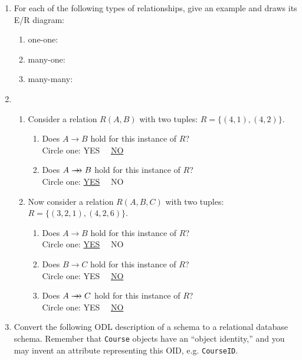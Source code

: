 \documentclass[12pt]{article}
\begin{document}
\begin{enumerate}
\newpage
\item For each of the following types of relationships, give an
	example and draws its E/R diagram:
    \begin{enumerate}
	\item one-one:
	\item many-one:
	\item many-many:
    \end{enumerate}
\item 
  \begin{enumerate}
    \item Consider a relation $R(A,B)$ with two tuples: $R=\{(4,1),(4,2)\}$.
    \begin{enumerate}
	\item Does $A\rightarrow B$ hold for this instance of $R$?\\
	    \smallskip
	    Circle one: YES \ \ \underline{NO}
	    \bigskip
	\item Does $A\rightarrow\!\hspace{-0.5em}\rightarrow B$ hold for 
	    this instance of $R$?\\
	    \smallskip
	    Circle one: \underline{YES} \ \ NO
	    \bigskip
	    \bigskip
    \end{enumerate}
    \item Now consider a relation $R(A,B,C)$ with two tuples:
    $R = \{(3,2,1), (4,2,6)\}$.
    \begin{enumerate}
	\item Does $A\rightarrow B$ hold for this instance of $R$?\\
	    \smallskip
	    Circle one: \underline{YES} \ \ NO
	    \bigskip
	\item Does $B\rightarrow C$ hold for this instance of $R$?\\
	    \smallskip
	    Circle one: YES \ \ \underline{NO}
	    \bigskip
	\item Does $A\rightarrow\!\hspace{-0.5em}\rightarrow C$ 
	    hold for this instance of $R$?\\
	    \smallskip
	    Circle one: YES \ \ \underline{NO}
	    \bigskip
    \end{enumerate}
   \end{enumerate}

\newpage
\item Convert the following ODL description of a schema to a relational
database schema.  Remember that {\tt Course} objects have an ``object
identity,'' and you may invent an attribute representing this OID, 
e.g. {\tt CourseID}.  


\end{enumerate}
\end{document}
